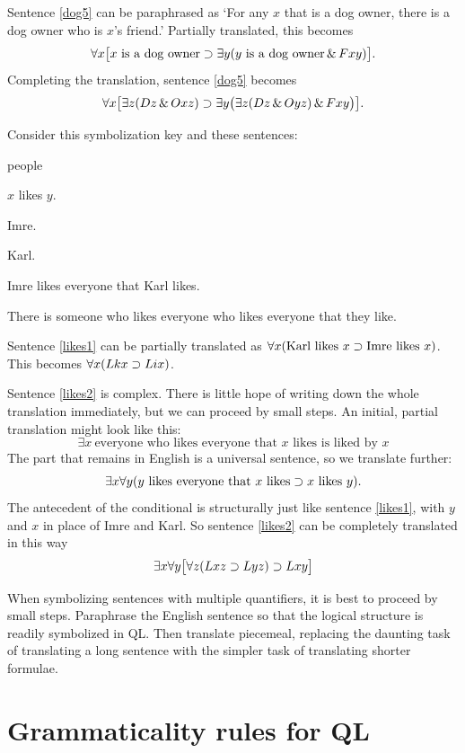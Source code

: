 Sentence \ref{dog5} can be paraphrased as `For any $x$ that is a dog owner, there is a dog owner who is $x$'s friend.' Partially translated, this becomes $$\forall x\bigl[\mbox{$x$ is a dog owner}\supset\exists y(\mbox{$y$ is a dog owner}\,\&\, Fxy)\bigr].$$ Completing the translation, sentence \ref{dog5} becomes $$\forall x\bigl[\exists z(Dz \,\&\, Oxz)\supset\exists y\bigl(\exists z(Dz \,\&\, Oyz)\,\&\, Fxy\bigr)\bigr].$$

Consider this symbolization key and these sentences:
\begin{ekey}
\item[UD:] people
\item[Lxy:] $x$ likes $y$.
\item[i:] Imre.
\item[k:] Karl.
\end{ekey}
\begin{earg}
\item[\ex{likes1}]Imre likes everyone that Karl likes.
\item[\ex{likes2}]There is someone who likes everyone who likes everyone that they like.
\end{earg}

Sentence \ref{likes1} can be partially translated as $\forall x(\mbox{Karl likes $x$}\supset\mbox{Imre likes $x$})$. This becomes $\forall x(Lkx\supset Lix)$.


Sentence \ref{likes2} is complex. There is little hope of writing down the whole translation immediately, but we can proceed by small steps. An initial, partial translation might look like this: $$\exists x\ \mbox{everyone who likes everyone that $x$ likes is liked by $x$}$$
The part that remains in English is a universal sentence, so we translate further: $$\exists x\forall y(\mbox{$y$ likes everyone that $x$ likes}\supset\mbox{$x$ likes $y$}).$$
The antecedent of the conditional is structurally just like sentence \ref{likes1}, with $y$ and $x$ in place of Imre and Karl. So sentence \ref{likes2} can be completely translated in this way $$\exists x\forall y\bigl[\forall z(Lxz \supset Lyz) \supset Lxy\bigr]$$

When symbolizing sentences with multiple quantifiers, it is best to proceed by small steps. Paraphrase the English sentence so that the logical structure is readily symbolized in QL. Then translate piecemeal, replacing the daunting task of translating a long sentence with the simpler task of translating shorter formulae.




\section{Grammaticality rules for QL}

